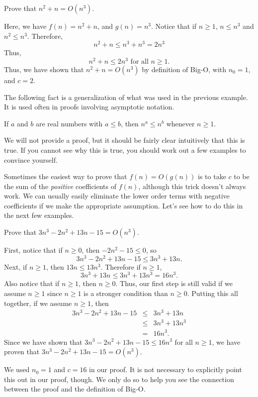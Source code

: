 \begin{exa}
Prove that $n^2+n=O(n^3)$.
\begin{sol}
Here, we have $f(n) = n^2+n$, and $g(n) = n^{3}$.
Notice that if $n\geq 1$, $n\leq n^3$ and $n^2\leq n^3$.
Therefore, 
$$n^2+n\leq n^3+n^3=2 n^3$$
Thus, 
$$n^2+n\leq 2 n^3 \mbox{ for all } n\geq 1.$$
Thus, we have shown that $n^2+n=O(n^3)$ by definition of Big-O, with $n_0=1$, and $c=2$.
\end{sol}
\end{exa}

The following fact is a generalization of what was used in the previous example.
It is used often in proofs involving asymptotic notation.
\begin{thm}
If $a$ and $b$ are real numbers with $a\leq b$, 
then $n^a\leq n^b$ whenever $n\geq 1$. 
\begin{pf}
We will not provide a proof, but it should be fairly clear intuitively that this is true.
If you cannot see why this is true, 
you should work out a few examples to convince yourself.
\end{pf}
\end{thm}

Sometimes the easiest way to prove that $f(n)=O(g(n))$ is to
take $c$ to be the sum of the {\em positive} coefficients of $f(n)$, 
although this trick doesn't always work.
We can usually easily eliminate the lower order terms with negative coefficients if we make 
the appropriate assumption.  Let's see how to do this in the next few examples.

\begin{exa}\label{exa:firstbigO}
Prove that $3n^{3}- 2n^2 + 13 n -15=O(n^3)$.
\begin{sol} 
First, notice that if $n\geq 0$, then $-2n^2-15\leq 0$, so 
$$3n^{3}- 2n^2 + 13 n -15\leq 3n^{3}+13n.$$
Next, if $n\geq 1$, then $13n\leq 13n^3$. 
Therefore if $n\geq 1$, $$3n^{3}+13n\leq 3n^3+13n^3=16n^3.$$
Also notice that if $n\geq 1$, then $n\geq 0$.
Thus, our first step is still valid if we assume $n\geq 1$ since $n\geq 1$
is a stronger condition than $n\geq 0$.  
Putting this all together, if we assume $n\geq 1$, then
\begin{eqnarray*}
3n^{3}- 2n^2 + 13 n -15 &\leq&3n^{3} +13 n \\
&\leq&3n^{3}+ 13 n^3 \\
&=&16n^3.
\end{eqnarray*} 
Since we have shown that $3n^{3}- 2n^2 + 13 n -15\leq 16n^3$ for all $n\geq 1$,
we have proven that $3n^{3}- 2n^2 + 13 n -15=O(n^3)$.  

We used $n_0=1$ and $c=16$ in our proof.  It is not necessary to explicitly point
this out in our proof, though.  We only do so to help you see the connection between
the proof and the definition of Big-O.
\end{sol}
\end{exa}


